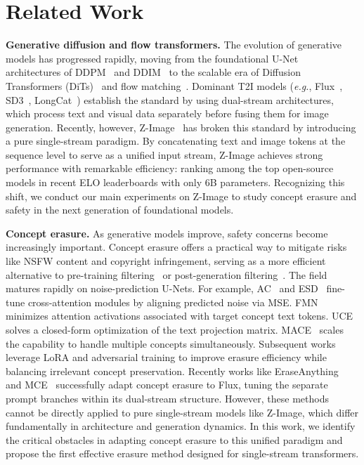 \section{Related Work}


\textbf{Generative diffusion and flow transformers.}
The evolution of generative models has progressed rapidly, moving from the foundational U-Net~\cite{unet} architectures of DDPM~\cite{ddpm} and DDIM~\cite{ddim} to the scalable era of Diffusion Transformers (DiTs)~\cite{DiT} and flow matching~\cite{flowmatching}. Dominant T2I models (\textit{e.g.}, Flux~\cite{flux1kontext}, SD3~\cite{sd3}, LongCat~\cite{LongCat}) establish the standard by using dual-stream architectures, which process text and visual data separately before fusing them for image generation. Recently, however, Z-Image~\cite{zimage} has broken this standard by introducing a pure single-stream paradigm. By concatenating text and image tokens at the sequence level to serve as a unified input stream, Z-Image achieves strong performance with remarkable efficiency: ranking among the top open-source models in recent ELO leaderboards with only 6B parameters. Recognizing this shift, we conduct our main experiments on Z-Image to study concept erasure and safety in the next generation of foundational models.



\textbf{Concept erasure.}
As generative models improve, safety concerns become increasingly important. Concept erasure offers a practical way to mitigate risks like NSFW content and copyright infringement, serving as a more efficient alternative to pre-training filtering~\cite{sd} or post-generation filtering~\cite{rando2022red}. The field matures rapidly on noise-prediction U-Nets. For example, AC~\cite{ca} and ESD~\cite{esd} fine-tune cross-attention modules by aligning predicted noise via MSE. FMN~\cite{FMN} minimizes attention activations associated with target concept text tokens. UCE~\cite{uce} solves a closed-form optimization of the text projection matrix. MACE~\cite{lu2024mace} scales the capability to handle multiple concepts simultaneously. Subsequent works~\cite{eap, eupmu, kim2025surveyconcepterasure} leverage LoRA and adversarial training to improve erasure efficiency while balancing irrelevant concept preservation. 
Recently works like EraseAnything~\cite{eraseanything} and MCE~\cite{mce} successfully adapt concept erasure to Flux, tuning the separate prompt branches within its dual-stream structure. 
However, these methods cannot be directly applied to pure single-stream models like Z-Image, which differ fundamentally in architecture and generation dynamics. In this work, we identify the critical obstacles in adapting concept erasure to this unified paradigm and propose the first effective erasure method designed for single-stream transformers.